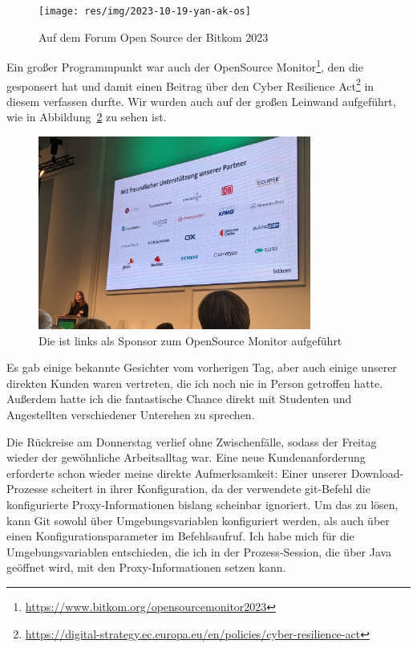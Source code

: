 \begin{figure}[htbp] %
    \centering
    \texttt{[image: res/img/2023-10-19-yan-ak-os]}
    \caption{Auf dem Forum Open Source der Bitkom 2023}
    \label{fig:foss23-yan}
\end{figure}

Ein großer Programmpunkt war auch der {\bitkom} OpenSource Monitor\footnote{\url{https://www.bitkom.org/opensourcemonitor2023}}, den die {\metaeffekt} gesponsert hat und damit einen Beitrag über den Cyber Resilience Act\footnote{\url{https://digital-strategy.ec.europa.eu/en/policies/cyber-resilience-act}} in diesem verfassen durfte.
Wir wurden auch auf der großen Leinwand aufgeführt, wie in Abbildung\ \ref{fig:foss23-sponsor-metaeffekt} zu sehen ist.

\begin{figure}[htbp] %
    \centering
    \includegraphics[width=0.8\textwidth, keepaspectratio]{res/img/2023-10-19-ak-os-metaeffekt-sponsor}
    \caption{Die {\metaeffekt} ist links als Sponsor zum OpenSource Monitor aufgeführt}
    \label{fig:foss23-sponsor-metaeffekt}
\end{figure}

Es gab einige bekannte Gesichter vom vorherigen Tag, aber auch einige unserer direkten Kunden waren vertreten, die ich noch nie in Person getroffen hatte.
Außerdem hatte ich die fantastische Chance direkt mit Studenten und Angestellten verschiedener Unterehen zu sprechen.

\sweekdaymarginpar{\weekdayThursdayShort, \weekdayFridayShort}

Die Rückreise am Donnerstag verlief ohne Zwischenfälle, sodass der Freitag wieder der gewöhnliche Arbeitsalltag war.
Eine neue Kundenanforderung erforderte schon wieder meine direkte Aufmerksamkeit:
Einer unserer Download-Prozesse scheitert in ihrer Konfiguration, da der verwendete git-Befehl die konfigurierte Proxy-Informationen bislang scheinbar ignoriert.
Um das zu lösen, kann Git sowohl über Umgebungsvariablen konfiguriert werden, als auch über einen Konfigurationsparameter im Befehlsaufruf.
Ich habe mich für die Umgebungsvariablen entschieden, die ich in der Prozess-Session, die über Java geöffnet wird, mit den Proxy-Informationen setzen kann.

